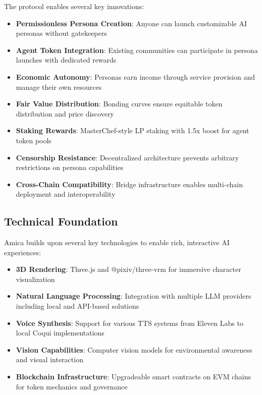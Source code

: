 \documentclass{article}
\begin{document}
The protocol enables several key innovations:

\begin{itemize}
    \item \textbf{Permissionless Persona Creation}: Anyone can launch customizable AI personas without gatekeepers
    \item \textbf{Agent Token Integration}: Existing communities can participate in persona launches with dedicated rewards
    \item \textbf{Economic Autonomy}: Personas earn income through service provision and manage their own resources
    \item \textbf{Fair Value Distribution}: Bonding curves ensure equitable token distribution and price discovery
    \item \textbf{Staking Rewards}: MasterChef-style LP staking with 1.5x boost for agent token pools
    \item \textbf{Censorship Resistance}: Decentralized architecture prevents arbitrary restrictions on persona capabilities
    \item \textbf{Cross-Chain Compatibility}: Bridge infrastructure enables multi-chain deployment and interoperability
\end{itemize}

\subsection{Technical Foundation}

Amica builds upon several key technologies to enable rich, interactive AI experiences:

\begin{itemize}
    \item \textbf{3D Rendering}: Three.js and @pixiv/three-vrm for immersive character visualization
    \item \textbf{Natural Language Processing}: Integration with multiple LLM providers including local and API-based solutions
    \item \textbf{Voice Synthesis}: Support for various TTS systems from Eleven Labs to local Coqui implementations  
    \item \textbf{Vision Capabilities}: Computer vision models for environmental awareness and visual interaction
    \item \textbf{Blockchain Infrastructure}: Upgradeable smart contracts on EVM chains for token mechanics and governance
\end{itemize}
\end{document}
